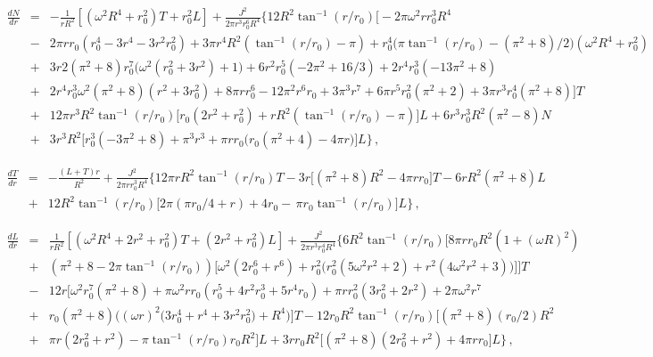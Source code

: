 \documentclass{article}
\begin{document}
\begin{eqnarray}
\label{eqN}
\frac{dN}{dr} &=& 
-\frac{1}{{r R^2}}
\left[ (\omega^2R^4 +r_0^2 ) T + r_0^2 L \right]
+
\frac{J^2}{2\pi r^3r_0^6 R^4}
\Big\{ 
12 R^2 \tan^{-1}  
(r/r_0)
\Big[
-2\pi \omega^2 r r_0^3 R^4
\nonumber  \\ 
&-&
2\pi r r_0(r_0^4-3r^4-3r^2r_0^2)
+
 3\pi r^4R^2 
(\tan^{-1}  
(r/r_0)
- \pi)
+
r_0^4
\Big(\pi \tan^{-1}  
(r/r_0)
- (\pi^2+8)/2 \Big)
(\omega^2R^4+r_0^2)
  \nonumber  \\ 
&+& 3r
 2(\pi^2+8)r_0^7 \Big(\omega^2 (r_0^2 + 3r^2) +1\Big)
 + 6r^2r_0^5 
 ( - 2\pi^2 + 16/3)
 + 2r^4r_0^3 ( - 13\pi^2 + 8)
  \nonumber  \\ 
&+&
  2r^4r_0^3 \omega^2 (\pi^2+8) (r^2+3r_0^2)
  +  8 \pi r r_0^6 -12\pi^2r^6r_0
  + 3\pi^3 r^7
  + 6\pi r^5 r_0^2 (\pi^2+2)
  +3 \pi r^3 r_0^4 (\pi^2+8)
\Big]
T
  \nonumber  \\ 
&+&
  12 \pi  r^3 R^2 \tan^{-1}  
  (r/r_0)
  \Big[ 
  r_0(2r^2+r_0^2) 
 + r R^2 (\tan^{-1}  
  (r/r_0)
  - \pi) 
  \Big]
  L 
  + 6 r^3 r_0^3 R^2  (\pi^2-8) N
   \nonumber  \\     
&+& 3 r^3 R^2 \Big[r_0^3 (-3\pi^2+8)
    +\pi^3 r^3 
    + \pi rr_0\Big(r_0(\pi^2+4)-4\pi r\Big)
   \Big]
   L
\Big\}
\, ,
\end{eqnarray}


\begin{eqnarray}
\label{eqT}
	\frac{dT}{dr} &=&  
 -\frac{(L+T)r}{R^2}
  +
  \frac{J^2}{2\pi rr_0^3 R^4}
  \Big\{ 
12 \pi r R^2 \tan^{-1} (r/r_0) T 
    -
    3r \Big[(\pi^2+8)R^2-4\pi rr_0 \Big] T
    - 6rR^2 (\pi^2+8) L
 \nonumber \\  &+&
12 R^2 \tan^{-1} (r/r_0)
    \Big[ 2\pi (\pi r_0/4+r) + 4r_0
    - \, 
    \pi r_0 \tan^{-1} (r/r_0)
    \Big] L
  \Big\}
	\, ,
\end{eqnarray}







\begin{eqnarray}
\frac{dL}{dr} &=& 
\label{eqL}
\frac{1}{r R^2} \left[(\omega^2R^4+2r^2+r_0^2)T+(2r^2+r_0^2)L\right]
+
\frac{J^2}{2\pi r^3r_0^4 R^4}
\Big\{6R^2 \tan^{-1} (r/r_0)
    \Big[
     8\pi r r_0 R^2 (1+(\omega R)^2)
     \nonumber  \\  &+&
(\pi^2+8 -2\pi \tan^{-1} (r/r_0) )
  \Big[\omega^2 (2r_0^6+r^6)
 +   r_0^2 
      \Big(r_0^2(5\omega^2r^2+2) + r^2(4\omega^2r^2+3)\Big)\Big]  
    \Big]
    T
     \nonumber  \\ 
     &-& 12 r
     \Big[ \omega^2 r_0^7 (\pi^2+8)
     + \pi\omega^2 rr_0(r_0^5+4r^2r_0^3 
     +5r^4r_0)
       +  
      \pi rr_0^2 (3r_0^2+2r^2)
      + 2\pi\omega^2 r^7
       \nonumber  \\ 
       &+&  
       r_0 (\pi^2+8) \Big((\omega r)^2 \Big(3r_0^4+r^4+3r^2r_0^2\Big) + R^4\Big)
     \Big] T
      -
      12 r_0 R^2 \tan^{-1} (r/r_0)
       \Big[ (\pi^2+8) (r_0/2) R^2
      \nonumber  \\ 
      &+& 
      \pi r(2r_0^2+r^2)
      - \pi \tan^{-1} (r/r_0) r_0 R^2
      \Big] L 
       + 3 rr_0R^2
       \Big[ (\pi^2+8) (2r_0^2+r^2)
       + 4\pi rr_0
       \Big] L
\Big\}
\, ,
\end{eqnarray}
\end{document}

